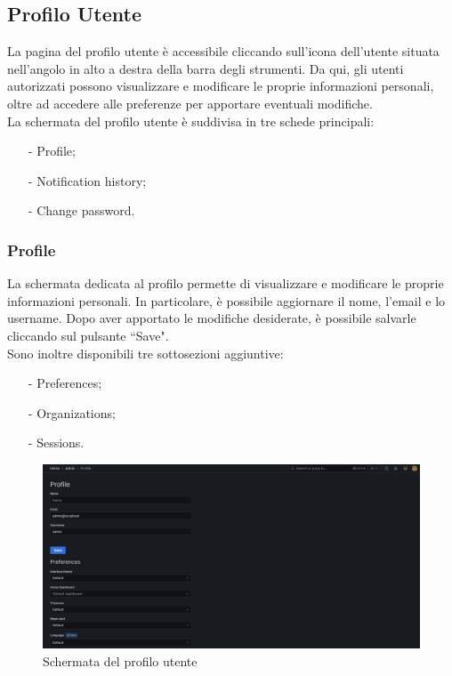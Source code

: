 \documentclass[10pt]{article}
\begin{document}
\begin{justify}
\subsection{Profilo Utente}
La pagina del profilo utente è accessibile cliccando sull'icona dell'utente situata nell'angolo in alto a destra della barra degli strumenti. Da qui, gli utenti autorizzati possono visualizzare e modificare le proprie informazioni personali, oltre ad accedere alle preferenze per apportare eventuali modifiche.\\
La schermata del profilo utente è suddivisa in tre schede principali:  
\begin{itemize}  
    \item[-] Profile; 
    \item[-] Notification history; 
    \item[-] Change password.  
\end{itemize}
    
    \subsubsection{Profile}
    La schermata dedicata al profilo permette di visualizzare e modificare le proprie informazioni personali. In particolare, è possibile aggiornare il nome, l'email e lo username. Dopo aver apportato le modifiche desiderate, è possibile salvarle cliccando sul pulsante ``Save".\\
    Sono inoltre disponibili tre sottosezioni aggiuntive:
    \begin{itemize}
        \item[-] Preferences;
        \item[-] Organizations;
        \item[-] Sessions.
    \end{itemize}
    \begin{figure}[H]
    \centering
    \includegraphics[width=1\linewidth]{profile.png}
    \caption{Schermata del profilo utente}
    \end{figure}


\end{justify}
\end{document}
